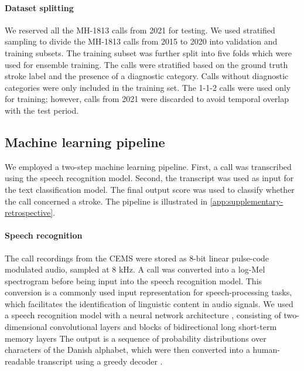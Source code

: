 {\paragraph{Dataset splitting}

We reserved all the MH-1813 calls from 2021 for testing. We used stratified sampling to divide the MH-1813 calls from 2015 to 2020 into validation and training subsets. The training subset was further split into five folds which were used for ensemble training. The calls were stratified based on the ground truth stroke label and the presence of a diagnostic category. Calls without diagnostic categories were only included in the training set. The 1-1-2 calls were used only for training; however, calls from 2021 were discarded to avoid temporal overlap with the test period.


\subsection{Machine learning pipeline}

We employed a two-step machine learning pipeline. First, a call was transcribed using the speech recognition model. Second, the transcript was used as input for the text classification model. The final output score was used to classify whether the call concerned a stroke. The pipeline is illustrated in \cref{app:supplementary-retrospective}.


\paragraph{Speech recognition}

The call recordings from the CEMS were stored as 8-bit linear pulse-code modulated audio, sampled at 8 kHz. A call was converted into a log-Mel spectrogram before being input into the speech recognition model. This conversion is a commonly used input representation for speech-processing tasks, which facilitates the identification of linguistic content in audio signals. We used a speech recognition model with a neural network architecture \parencite{borgholt_endtoend_2020}, consisting of two-dimensional convolutional layers \parencite{cite22} and blocks of bidirectional long short-term memory layers \parencite{hochreiter_long_1997} The output is a sequence of probability distributions over characters of the Danish alphabet, which were then converted into a human-readable transcript using a greedy decoder \parencite{graves_connectionist_2006}.


}
